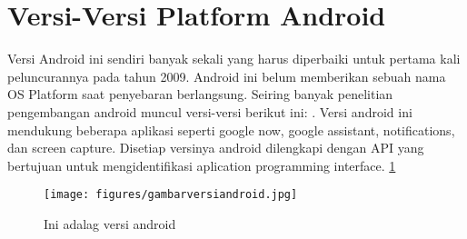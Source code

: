 	\section{Versi-Versi Platform Android}
		Versi Android ini sendiri banyak sekali yang harus diperbaiki untuk pertama kali peluncurannya pada tahun 2009. Android ini belum memberikan sebuah nama OS Platform
		saat penyebaran berlangsung. Seiring banyak penelitian pengembangan android muncul versi-versi berikut ini: \cite{suryani2015rancang}. Versi android ini mendukung beberapa aplikasi seperti google now, google assistant, notifications, dan screen capture.
		Disetiap versinya android dilengkapi dengan API yang bertujuan untuk mengidentifikasi aplication programming interface.
\ref{gambarversiandroid}
\begin{figure}[ht]
\centerline{\texttt{[image: figures/gambarversiandroid.jpg]}}
\caption{Ini adalag versi android}
\label{gambarversiandroid}
\end{figure}

